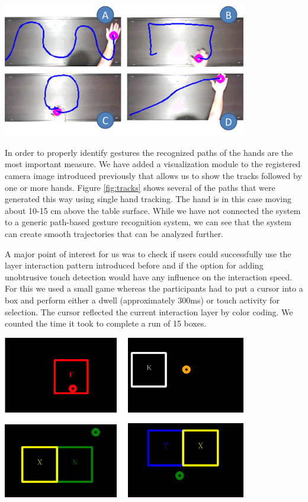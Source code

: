 \begin{minipage}{\linewidth}
\centering
\includegraphics[width=0.8\textwidth]{images/tracks}
\label{fig:tracks}
\end{minipage}

In order to properly identify gestures the recognized paths of the hands are the most important measure. We have added a visualization module to the registered camera image introduced previously that allows us to show the tracks followed by one or more hands. Figure \ref{fig:tracks} shows several of the paths that were generated this way using single hand tracking. The hand is in this case moving about 10-15 cm above the table surface. While we have not connected the system to a generic path-based gesture recognition system, we can see that the system can create smooth trajectories that can be analyzed further.

A major point of interest for us was to check if users could successfully use the layer interaction pattern introduced before and if the option for adding unobtrusive touch detection would have any influence on the interaction speed. For this we used a small game whereas the participants had to put a cursor into a box and perform either a dwell (approximately 300ms) or touch activity for selection. The cursor reflected the current interaction layer by color coding. We counted the time it took to complete a run of 15 boxes.

\begin{minipage}{\linewidth}
\centering
\includegraphics[width=0.8\textwidth]{images/eval_speed}
\label{fig:eval_speed}
\end{minipage}

